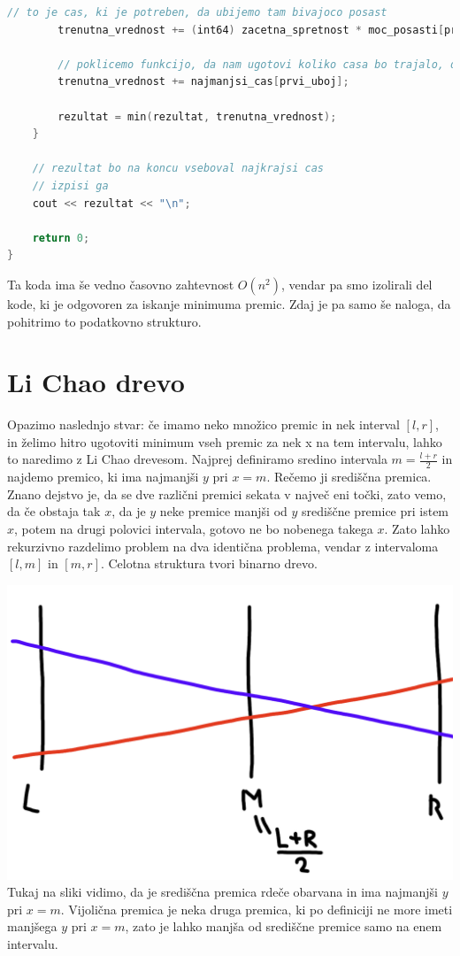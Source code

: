 \begin{lstlisting}[label={lst:code7}, language=C++]
        // to je cas, ki je potreben, da ubijemo tam bivajoco posast
        trenutna_vrednost += (int64) zacetna_spretnost * moc_posasti[prvi_uboj];

        // poklicemo funkcijo, da nam ugotovi koliko casa bo trajalo, da pridemo do konca
        trenutna_vrednost += najmanjsi_cas[prvi_uboj];

        rezultat = min(rezultat, trenutna_vrednost);
    }

    // rezultat bo na koncu vseboval najkrajsi cas
    // izpisi ga
    cout << rezultat << "\n";

    return 0;
}
\end{lstlisting}

Ta koda ima še vedno časovno zahtevnost $O(n^2)$, vendar pa smo izolirali del kode, ki je odgovoren za iskanje minimuma premic.
Zdaj je pa samo še naloga, da pohitrimo to podatkovno strukturo.

\section{Li Chao drevo}\label{sec:li-chao-drevo}
Opazimo naslednjo stvar: če imamo neko množico premic in nek interval $[l, r]$, in želimo hitro ugotoviti minimum vseh premic za nek x na tem intervalu, lahko to naredimo z Li Chao drevesom.
Najprej definiramo sredino intervala $m = \frac{l + r}{2}$ in najdemo premico, ki ima najmanjši $y$ pri $x = m$.
Rečemo ji središčna premica.
Znano dejstvo je, da se dve različni premici sekata v največ eni točki, zato vemo, da če obstaja tak $x$, da je $y$ neke premice manjši od $y$ središčne premice pri istem $x$, potem na drugi polovici intervala, gotovo ne bo nobenega takega $x$.
Zato lahko rekurzivno razdelimo problem na dva identična problema, vendar z intervaloma $[l, m]$ in $[m, r]$.
Celotna struktura tvori binarno drevo.

\includegraphics[scale=0.6]{image1}
Tukaj na sliki vidimo, da je središčna premica rdeče obarvana in ima najmanjši $y$ pri $x = m$.
Vijolična premica je neka druga premica, ki po definiciji ne more imeti manjšega $y$ pri $x = m$, zato je lahko manjša od središčne premice samo na enem intervalu.


